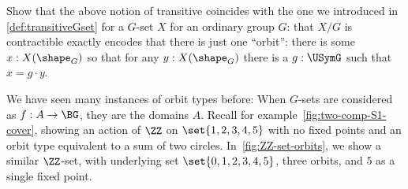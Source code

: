 \begin{xca}
  Show that the above notion of transitive coincides with the one we introduced in \cref{def:transitiveGset} for a $G$-set $X$ for an ordinary group $G$:
  that $X/G$ is contractible exactly encodes that there is just one ``orbit'':
  there is some $x:X(\shape_G)$ so that for any $y:X(\shape_G)$
  there is a $g:\USymG$ such that $x=g\cdot y$.
\end{xca}

We have seen many instances of orbit types before:
When $G$-sets are considered as \coverings $f : A \to \BG$,
they are the domains $A$.
Recall for example~\cref{fig:two-comp-S1-cover},
showing an action of $\ZZ$ on $\set{1,2,3,4,5}$ with no fixed points
and an orbit type equivalent to a sum of two circles.
In~\cref{fig:ZZ-set-orbits}, we show a similar $\ZZ$-set,
with underlying set $\set{0,1,2,3,4,5}$, three orbits,
and $5$ as a single fixed point.

